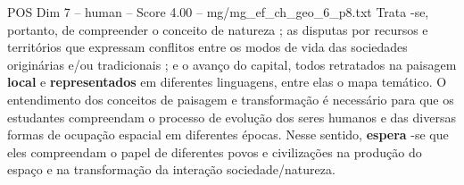 \begin{textsample}{POS Dim 7 – human – Score 4.00 – mg/mg\_ef\_ch\_geo\_6\_p8.txt}  \label{ex:f7_pos_003}
Trata -se, portanto, de compreender o conceito de natureza ; as disputas por recursos e territórios que expressam conflitos entre os modos de vida das sociedades originárias e/ou tradicionais ; e o avanço do capital, todos retratados na paisagem \textbf{local} e \textbf{representados} em diferentes linguagens, entre elas o mapa temático.
O entendimento dos conceitos de paisagem e transformação é necessário para que os estudantes compreendam o processo de evolução dos seres humanos e das diversas formas de ocupação espacial em diferentes épocas.
Nesse sentido, \textbf{espera} -se que eles compreendam o papel de diferentes povos e civilizações na produção do espaço e na transformação da interação sociedade/natureza.

\end{textsample}
